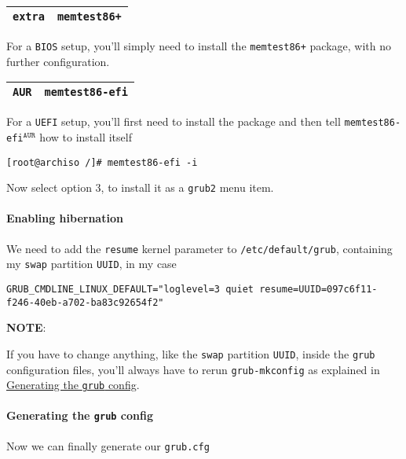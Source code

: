 \documentclass[9pt]{report}
\newcommand{\admonition}[2]{\textbf{#1}: {#2}}
\begin{document}
\begin{center}
\begin{tabular}{|c|c|}
\hline
\texttt{extra} & \texttt{memtest86+} \\ 
\hline
\end{tabular}
\end{center}

For a \texttt{BIOS} setup, you’ll simply need to install the \texttt{memtest86+} package, with no further configuration.


\begin{center}
\begin{tabular}{|c|c|}
\hline
\texttt{AUR} & \texttt{memtest86-efi} \\ 
\hline
\end{tabular}
\end{center}

For a \texttt{UEFI} setup, you’ll first need to install the package and then tell \texttt{memtest86-efi}${}^{\texttt{AUR}}$ how to install itself


\begin{verbatim}
[root@archiso /]# memtest86-efi -i
\end{verbatim}

Now select option 3, to install it as a \texttt{grub2} menu item.



\vfill\eject

\hypertarget{x-enabling-hibernation}{\paragraph{Enabling hibernation}}
We need to add the \texttt{resume} kernel parameter to \texttt{/etc/default/grub}, containing my \texttt{swap} partition \texttt{UUID}, in my case


\begin{verbatim}
GRUB_CMDLINE_LINUX_DEFAULT="loglevel=3 quiet resume=UUID=097c6f11-f246-40eb-a702-ba83c92654f2"
\end{verbatim}

\admonition{NOTE}{If you have to change anything, like the \texttt{swap} partition \texttt{UUID}, inside the \texttt{grub} configuration files, you’ll always have to rerun \texttt{grub-mkconfig} as explained in \hyperlink{generating-the-grub-config}{Generating the \texttt{grub} config}.

}
\hypertarget{x-generating-the-grub-config}{\paragraph{Generating the \texttt{grub} config}}
Now we can finally generate our \texttt{grub.cfg}
\end{document}
